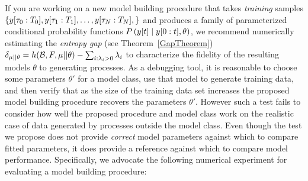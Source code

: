 If you are working on a new model building procedure that takes
\emph{training} samples $\left\{ y[\tau_0:T_0],
  y[\tau_1:T_1], \ldots, y[\tau_N:T_N], \right\}$ and
produces a family of parameterized conditional probability functions
$P \left({y}{[t]}\mid y[0:t],\theta \right)$, we recommend
numerically estimating the \emph{entropy gap} (see
Theorem~\ref{GapTheorem}) $\delta_{\mu||\theta} =
h({\cal{B}},F,\mu||\theta) - \sum_{i : \lambda_i > 0} \lambda_i$ to
characterize the fidelity of the resulting models $\theta$ to
generating processes.  As a debugging tool, it is reasonable to choose
some parameters $\theta'$ for a model class, use that model to
generate training data, and then verify that as the size of the
training data set increases the proposed model building procedure
recovers the parameters $\theta'$.  However such a test fails to
consider how well the proposed procedure and model class work on the
realistic case of data generated by processes outside the model class.
Even though the test we propose does not provide \emph{correct} model
parameters against which to compare fitted parameters, it does provide
a reference against which to compare model performance.  Specifically,
we advocate the following numerical experiment for evaluating a model
building procedure:
